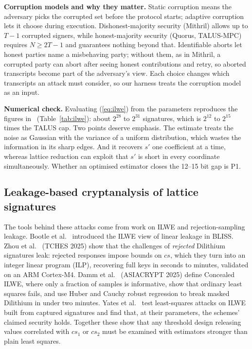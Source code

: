 \documentclass[10pt,conference,a4paper]{IEEEtran}
\begin{document}
\textbf{Corruption models and why they matter.} Static corruption means the adversary picks the corrupted set before the
protocol starts; adaptive corruption lets it choose during execution. Dishonest-majority security (Mithril) allows up to
$T-1$ corrupted signers, while honest-majority security (Quorus, TALUS-MPC) requires $N\ge2T-1$ and guarantees nothing
beyond that. Identifiable aborts let honest parties name a misbehaving party; without them, as in Mithril, a corrupted
party can abort after seeing honest contributions and retry, so aborted transcripts become part of the adversary's view.
Each choice changes which transcripts an attack must consider, so our harness treats the corruption model as an input.

\textbf{Numerical check.} Evaluating (\ref{eq:ilwe}) from the parameters reproduces the figures in~\cite{niot}
(Table~\ref{tab:ilwe}): about $2^{28}$ to $2^{31}$ signatures, which is $2^{12}$ to $2^{15}$ times the TALUS cap. Two points
deserve emphasis. The estimate treats the noise as Gaussian with the variance of a uniform distribution, which wastes the
information in its sharp edges. And it recovers $s'$ one coefficient at a time, whereas lattice reduction can exploit
that $s'$ is short in every coordinate simultaneously. Whether an optimised estimator closes the 12--15 bit gap is P1.

\subsection{Leakage-based cryptanalysis of lattice signatures}
The tools behind these attacks come from work on ILWE and rejection-sampling leakage. Bootle et al.~\cite{ilwe}
introduced the ILWE view of linear leakage in BLISS. Zhou et al.~\cite{rejected} (TCHES 2025) show that the challenges of
\emph{rejected} Dilithium signatures leak: rejected responses impose bounds on $cs$, which they turn into an integer
linear program (ILP), recovering full keys in seconds to minutes, validated on an ARM Cortex-M4. Damm et
al.~\cite{concealed} (ASIACRYPT 2025) define Concealed ILWE, where only a fraction of samples is informative, show that
ordinary least squares fails, and use Huber and Cauchy robust regression to break masked Dilithium in under two minutes.
Yates et al.~\cite{yates} test least-squares attacks on ILWE built from captured signatures and find that, at their
parameters, the schemes' claimed security holds. Together these show that any threshold design releasing values
correlated with $cs_1$ or $cs_2$ must be examined with estimators stronger than plain least squares.
\end{document}

